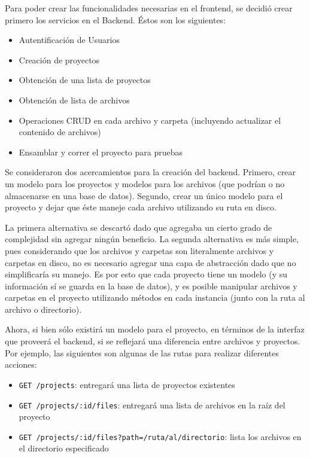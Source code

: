 \documentclass[12pt,titlepage,]{article}
\begin{document}
\label{section:create-services}

Para poder crear las funcionalidades necesarias en el frontend, se
decidió crear primero los servicios en el Backend. Éstos son los
siguientes:

\begin{itemize}
\item
  Autentificación de Usuarios
\item
  Creación de proyectos
\item
  Obtención de una lista de proyectos
\item
  Obtención de lista de archivos
\item
  Operaciones CRUD en cada archivo y carpeta (incluyendo actualizar el
  contenido de archivos)
\item
  Ensamblar y correr el proyecto para pruebas
\end{itemize}

Se consideraron dos acercamientos para la creación del backend. Primero,
crear un modelo para los proyectos y modelos para los archivos (que
podrían o no almacenarse en una base de datos). Segundo, crear un único
modelo para el proyecto y dejar que éste maneje cada archivo utilizando
su ruta en disco.

La primera alternativa se descartó dado que agregaba un cierto grado de
complejidad sin agregar ningún beneficio. La segunda alternativa es más
simple, pues considerando que los archivos y carpetas son literalmente
archivos y carpetas en disco, no es necesario agregar una capa de
abstracción dado que no simplificaría su manejo. Es por esto que cada
proyecto tiene un modelo (y su información sí se guarda en la base de
datos), y es posible manipular archivos y carpetas en el proyecto
utilizando métodos en cada instancia (junto con la ruta al archivo o
directorio).

Ahora, si bien sólo existirá un modelo para el proyecto, en términos de
la interfaz que proveerá el backend, si se reflejará una diferencia
entre archivos y proyectos. Por ejemplo, las siguientes son algunas de
las rutas para realizar diferentes acciones:

\begin{itemize}
\item
  \texttt{GET /projects}: entregará una lista de proyectos existentes
\item
  \texttt{GET /projects/:id/files}: entregará una lista de archivos en
  la raíz del proyecto
\item
  \texttt{GET /projects/:id/files?path=/ruta/al/directorio}: lista los
  archivos en el directorio especificado
\end{itemize}
\end{document}
